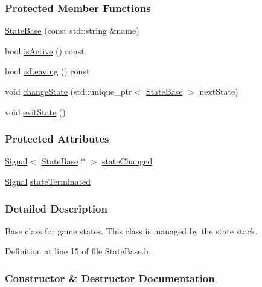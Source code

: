 \subsubsection*{Protected Member Functions}
\begin{DoxyCompactItemize}
\item 
\hyperlink{a00072_aee338ee916b37c21d986e2f0c6a3cf01}{State\+Base} (const std\+::string \&name)
\item 
bool \hyperlink{a00072_a9dbd0e91cd8812be304df62aa8bca558}{is\+Active} () const 
\item 
bool \hyperlink{a00072_aaec38f3ff2f0af1bffcad4054f92f5f0}{is\+Leaving} () const 
\item 
void \hyperlink{a00072_a95a7fffdec13deafa7855755f6f5f153}{change\+State} (std\+::unique\+\_\+ptr$<$ \hyperlink{a00072}{State\+Base} $>$ next\+State)
\item 
void \hyperlink{a00072_a04227376a170bdb851e0e03a4949f564}{exit\+State} ()
\end{DoxyCompactItemize}
\subsubsection*{Protected Attributes}
\begin{DoxyCompactItemize}
\item 
\hyperlink{a00065}{Signal}$<$ \hyperlink{a00072}{State\+Base} $\ast$ $>$ \hyperlink{a00072_aa585934f221ce16ddac54f79c759e30e}{state\+Changed}
\item 
\hyperlink{a00065}{Signal} \hyperlink{a00072_aa833cf334d703956398b0eab5353fb14}{state\+Terminated}
\end{DoxyCompactItemize}


\subsubsection{Detailed Description}
Base class for game states. This class is managed by the state stack. 

Definition at line 15 of file State\+Base.\+h.



\subsubsection{Constructor \& Destructor Documentation}
